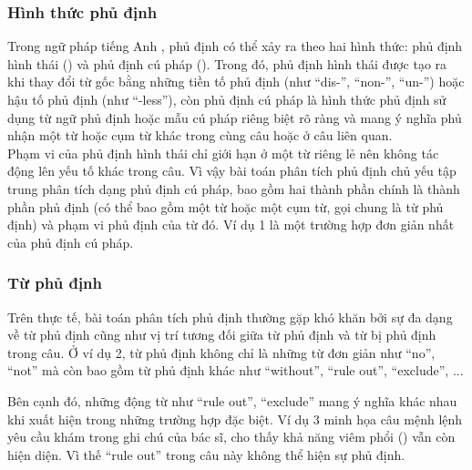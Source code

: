 
\subsubsection*{Hình thức phủ định}

Trong ngữ pháp tiếng Anh \cite{Givon1993}, phủ định có thể xảy ra theo hai hình thức: phủ định hình thái () và phủ định cú pháp (). Trong đó, phủ định hình thái được tạo ra khi thay đổi từ gốc bằng những tiền tố phủ định (như ``dis-'', ``non-'', ``un-'') hoặc hậu tố phủ định (như ``-less''), còn phủ định cú pháp là hình thức phủ định sử dụng từ ngữ phủ định hoặc mẫu cú pháp riêng biệt rõ ràng và mang ý nghĩa phủ nhận một từ hoặc cụm từ khác trong cùng câu hoặc ở câu liên quan.\\

Phạm vi của phủ định hình thái chỉ giới hạn ở một từ riêng lẻ nên không tác động lên yếu tố khác trong câu. Vì vậy bài toán phân tích phủ định chủ yếu tập trung phân tích dạng phủ định cú pháp, bao gồm hai thành phần chính là thành phần phủ định (có thể bao gồm một từ hoặc một cụm từ, gọi chung là từ phủ định) và phạm vi phủ định của từ đó. Ví dụ 1 là một trường hợp đơn giản nhất của phủ định cú pháp.

\subsubsection*{Từ phủ định}

Trên thực tế, bài toán phân tích phủ định thường gặp khó khăn bởi sự đa dạng về từ phủ định cũng như vị trí tương đối giữa từ phủ định và từ bị phủ định trong câu. Ở ví dụ 2, từ phủ định không chỉ là những từ đơn giản như ``no'', ``not'' mà còn bao gồm từ phủ định khác như ``without'', ``rule out'', ``exclude'', ... 


Bên cạnh đó, những động từ như ``rule out'', ``exclude'' mang ý nghĩa khác nhau khi xuất hiện trong những trường hợp đặc biệt. Ví dụ 3 minh họa câu mệnh lệnh yêu cầu khám trong ghi chú của bác sĩ, cho thấy khả năng viêm phổi () vẫn còn hiện diện. Vì thế ``rule out'' trong câu này không thể hiện sự phủ định.

